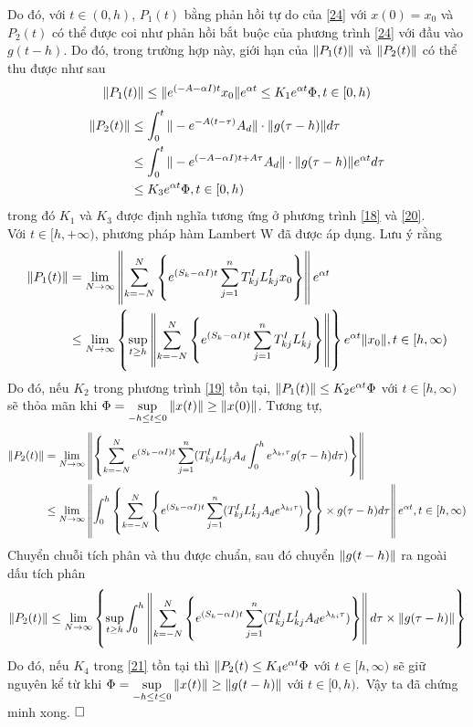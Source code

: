 \begin{cm}
Do đó, với $t \in (0,h)$, $P_1(t)$ bằng phản hồi tự do của \eqref{24} với $x(0) =x_0$ và $P_2(t)$ có thể được coi như phản hồi bắt buộc của phương trình \eqref{24} với đầu vào $g(t-h)$. Do đó,  trong trường hợp này, giới hạn của $\Vert P_1(t) \Vert$ và $\Vert P_2(t) \Vert$ có thể thu được như sau
\begin{align}\label{25}
	\Vert P_1(t) \Vert \le \Vert e^{(-A - \alpha I)t}x_0 \Vert e^{\alpha t} \le K_1 e^{\alpha t}\Phi, t \in [0,h)
\end{align}
\begin{align}\label{26}
	\Vert P_2(t) \Vert &\le \int_{0}^{t}\Vert -e^{-A(t-\tau)}A_d \Vert \cdot \Vert g(\tau - h) \Vert d\tau \notag\\
	&\le \int_{0}^{t}\Vert -e^{(-A - \alpha I)t + A\tau}A_d \Vert \cdot \Vert g(\tau - h) \Vert e^{\alpha t}d\tau \notag\\
	&\le K_3e^{\alpha t}	\Phi, t \in [0,h)
\end{align}
trong đó $K_1$ và $K_3$ được định nghĩa tương ứng ở phương trình \eqref{18} và \eqref{20}.\\
Với $t\in [h,+\infty)$, phương pháp hàm Lambert W đã được áp dụng. Lưu ý rằng
\begin{align}\label{27}
	\Vert P_1(t) \Vert &= \lim\limits_{N \to \infty} \left \Vert \sum_{k=-N}^{N} \left\{ e^{(S_k-\alpha I)t} \sum_{j =1}^n T^I_{kj}L^I_{kj}x_0\right\} \right \Vert e^{\alpha t} \notag\\
	& \le \lim \limits_{N \to \infty} \left\{ \sup \limits_{t \ge h} \left \Vert \sum_{k=-N}^{N} \left\{ e^{(S_k - \alpha I)t} \sum_{j =1}^n T^I_{kj} L^I_{kj}\right\} \right \Vert\right\} e^{\alpha t} \Vert x_0 \Vert, t \in [h,\infty)
\end{align}
Do đó, nếu $K_2$ trong phương trình \eqref{19} tồn tại, $\Vert P_1(t) \Vert \le K_2 e^{\alpha t} \Phi$ với $t \in [h,\infty)$ sẽ thỏa mãn khi $\Phi = \sup \limits_{-h \le t \le 0} \Vert x(t)\Vert \ge \Vert x(0)\Vert$. Tương tự,
\begin{align}\label{28}
	\Vert P_2(t)\Vert &= \lim\limits_{N \to \infty} \left \Vert \left\{  \sum_{k=-N}^N e^{(S_k - \alpha I)t} \sum_{j =1}^n (T^I_{kj}L^I_{kj}A_d \int_0^h e^{\lambda_{ki}\tau} g(\tau - h) d\tau)  \right\} \right \Vert \notag\\
	& \le \lim\limits_{N\to \infty} \left \Vert \int_0^h \left\{ \sum_{k=-N}^N \left\{ e^{(S_k - \alpha I)t} \sum_{j=1}^n (T^I_{kj} L^I_{kj}A_de^{\lambda_{ki}\tau})\right\}\right\} \times g(\tau - h) d \tau \right \Vert e^{\alpha t}, t \in [h,\infty)
	\end{align}
Chuyển chuỗi tích phân và thu được chuẩn, sau đó chuyển $\Vert g(t-h)\Vert$ ra ngoài dấu tích phân
\begin{align}\label{29}
	\Vert P_2(t) \Vert \le \lim \limits_{N\to \infty} \left \{ \sup \limits_{t \ge h} \int_0^h \left \Vert \sum_{k=-N}^N \left\{ e^{(S_k - \alpha I)t} \sum_{j =1}^n (T^I_{kj}L^I_{kj}A_de^{\lambda_{ki}\tau})\right\} \right \Vert d\tau \times \Vert g(\tau - h)\Vert \right\}
\end{align}
Do đó, nếu $K_4$ trong \eqref{21} tồn tại thì $\Vert P_2(t) \le K_4e^{\alpha t} \Phi$ với $t \in [h,\infty)$ sẽ giữ nguyên kể từ khi $\Phi = \sup \limits_{-h \le t \le 0} \Vert x(t) \Vert \ge \Vert g(t-h)\Vert$ với $t \in [0,h)$.\ 
Vậy ta đã chứng minh xong. $\hfill \square$
\end{cm}

